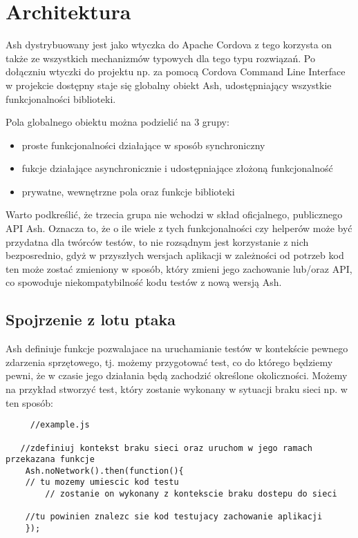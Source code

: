 \documentclass[brudnopis]{xmgr}
\begin{document}
\chapter{Architektura}

Ash dystrybuowany jest jako wtyczka do Apache Cordova z tego korzysta on także ze wszystkich mechanizmów typowych dla tego typu rozwiązań. Po dołączniu wtyczki do projektu np. za pomocą Cordova Command Line Interface w projekcie dostępny staje się globalny obiekt Ash, udostępniający wszystkie funkcjonalności biblioteki. 

Pola globalnego obiektu można podzielić na 3 grupy:  
\begin{itemize}
  \item proste funkcjonalności działające w sposób synchroniczny
  \item fukcje działające asynchronicznie i udostępniające złożoną funkcjonalność 
  \item prywatne, wewnętrzne pola oraz funkcje biblioteki
\end{itemize}
Warto podkreślić, że trzecia grupa nie wchodzi w skład oficjalnego, publicznego API Ash. Oznacza to, że o ile wiele z tych funkcjonalności czy helperów może być przydatna dla twórców testów, to nie rozsądnym jest korzystanie z nich bezposrednio, gdyż w przyszłych wersjach aplikacji w zależności od potrzeb kod ten może zostać zmieniony w sposób, który zmieni jego zachowanie lub/oraz API, co spowoduje niekompatybilność kodu testów z nową wersją Ash.

\section{Spojrzenie z lotu ptaka}

Ash definiuje funkcje pozwalajace na uruchamianie testów w kontekście pewnego zdarzenia sprzętowego, tj. możemy przygotować test, co do którego będziemy pewni, że w czasie jego działania będą zachodzić określone okoliczności. Możemy na przykład stworzyć test, który zostanie wykonany w sytuacji braku sieci np. w ten sposób:

\begin{lstlisting}
     //example.js

   //zdefiniuj kontekst braku sieci oraz uruchom w jego ramach przekazana funkcje
    Ash.noNetwork().then(function(){
	// tu mozemy umiescic kod testu
     	// zostanie on wykonany z kontekscie braku dostepu do sieci

	//tu powinien znalezc sie kod testujacy zachowanie aplikacji 
    });
\end{lstlisting}
\end{document}
